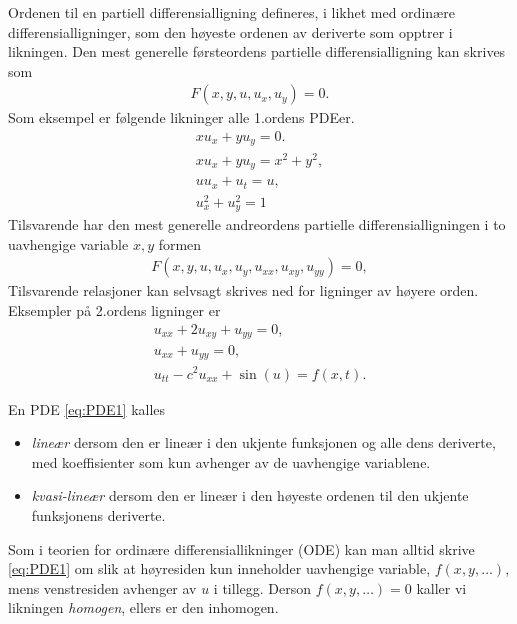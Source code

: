 Ordenen til en partiell differensialligning defineres, i likhet med ordinære differensialligninger, som den høyeste ordenen av deriverte som opptrer i likningen. Den mest generelle førsteordens partielle differensialligning kan skrives som
\begin{align}\label{eq:fo_PDE}
F(x, y, u, u_x, u_y) = 0. 
\end{align}
Som eksempel er følgende likninger alle 1.ordens PDEer.
\begin{equation}\label{eq:ex_fo_PDEs} \begin{aligned}
x u_x + y u_y = 0.\\
x u_x + y u_y = x^2 + y^2, \\
u u_x + u_t = u, \\
u_x^2 + u_y^2 = 1 \end{aligned}
\end{equation}
Tilsvarende har den mest generelle andreordens partielle differensialligningen i to uavhengige variable \( x, y \) formen
\begin{align}\label{eq:so_PDE}
F(x, y, u, u_x, u_y, u_{xx}, u_{xy}, u_{yy}) = 0,
\end{align}
Tilsvarende relasjoner kan selvsagt skrives ned for ligninger av høyere orden. Eksempler på 2.ordens ligninger er
\begin{equation}\label{eq:ex_so_PDEs}
\begin{aligned}u_{xx} + 2u_{xy} + u_{yy} = 0,\\
u_{xx} + u_{yy} = 0, \\
u_{tt} - c^2 u_{xx} + \sin(u)= f(x, t).\end{aligned}
\end{equation}


\begin{defn}{}
En PDE \eqref{eq:PDE1} kalles 
\begin{itemize}
\item \emph{lineær} dersom den er lineær i den ukjente funksjonen og alle dens deriverte, med koeffisienter som kun avhenger av de uavhengige variablene.
\item \emph{kvasi-lineær} dersom den er lineær i den høyeste ordenen til den ukjente funksjonens deriverte.
\end{itemize}
Som i teorien for ordinære differensiallikninger (ODE) kan man alltid skrive \eqref{eq:PDE1} om slik at høyresiden kun inneholder uavhengige variable, $f(x,y,\ldots)$, mens venstresiden avhenger av $u$ i tillegg. Derson $f(x,y,\ldots)=0$ kaller vi likningen \emph{homogen}, ellers er den inhomogen.
\end{defn}

